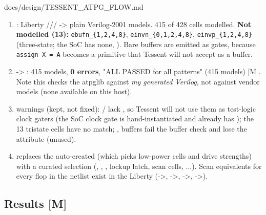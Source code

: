 \begin{relocated}{docs/design/TESSENT_ATPG_FLOW.md}
\begin{enumerate}
\def\labelenumi{\arabic{enumi}.}
\tightlist
\item
  : Liberty
  ///
  -\textgreater{} plain Verilog-2001 models. 415 of 428 cells modelled.
  \textbf{Not modelled (13):}
  \texttt{ebufn\_\allowbreak{}\{1,\allowbreak{}2,\allowbreak{}4,\allowbreak{}8\}},
  \texttt{einvn\_\allowbreak{}\{0,\allowbreak{}1,\allowbreak{}2,\allowbreak{}4,\allowbreak{}8\}},
  \texttt{einvp\_\allowbreak{}\{1,\allowbreak{}2,\allowbreak{}4,\allowbreak{}8\}}
  (three-state; the SoC has none, ). Bare
  buffers are emitted as  gates, because
  \texttt{assign\ X\ =\allowbreak{}\ A} becomes a  primitive
  that Tessent will not accept as a buffer.
\item
   -\textgreater{} : 415 models,
  \textbf{0 errors},  "ALL PASSED for all patterns" (415
  models) {[}M \code{build/libcomp/libcomp.log}{]}. Note this checks the
  atpglib against \emph{my generated Verilog}, not against vendor models
  (none available on this host).
\item
   warnings (kept, not fixed):
  / lack , so
  Tessent will not use them as test-logic clock gaters (the SoC clock
  gate is hand-instantiated and already has ); the 13 tristate
  cells have no match; ,  buffers fail the
  buffer check and lose the attribute (unused).
\item
   replaces the auto-created
   (which picks  low-power cells
  and  drive strengths) with a curated 
  selection (, , , 
  lockup latch,  scan cells, ...). Scan equivalents for every
  flop in the netlist exist in the Liberty
  (-\textgreater{},
  -\textgreater{},
  -\textgreater{},
  -\textgreater{}).
\end{enumerate}

\subsection{Results {[}M{]}}\label{tm:flow:tessent-atpg:4-results-m}


\end{relocated}
